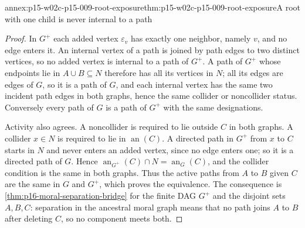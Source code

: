 \begin{annexitem}{annex:p15-w02c-p15-009-root-exposure}{thm:p15-w02c-p15-009-root-exposure}{A root with one child is never internal to a path}
\begin{proof}
In \(G^+\) each added vertex \(\varepsilon_v\) has exactly one neighbor,
namely \(v\), and no edge enters it. An internal vertex of a path is
joined by path edges to two distinct vertices, so no added vertex is
internal to a path of \(G^+\). A path of \(G^+\) whose endpoints lie in
\(A\cup B\subseteq N\) therefore has all its vertices in \(N\); all its
edges are edges of \(G\), so it is a path of \(G\), and each internal
vertex has the same two incident path edges in both graphs, hence the
same collider or noncollider status. Conversely every path of \(G\) is
a path of \(G^+\) with the same designations.

Activity also agrees. A noncollider is required to lie outside \(C\) in
both graphs. A collider \(x\in N\) is required to lie in
\(\operatorname{an}(C)\). A directed path in \(G^+\) from \(x\) to
\(C\) starts in \(N\) and never enters an added vertex, since no edge
enters one; so it is a directed path of \(G\). Hence
\(\operatorname{an}_{G^+}(C)\cap N=\operatorname{an}_G(C)\), and the
collider condition is the same in both graphs. Thus the active paths
from \(A\) to \(B\) given \(C\) are the same in \(G\) and \(G^+\), which
proves the equivalence. The consequence is
\cref{thm:p16-moral-separation-bridge} for the finite DAG \(G^+\) and
the disjoint sets \(A,B,C\): separation in the ancestral moral graph
means that no path joins \(A\) to \(B\) after deleting \(C\), so no
component meets both.
\end{proof}
\end{annexitem}

